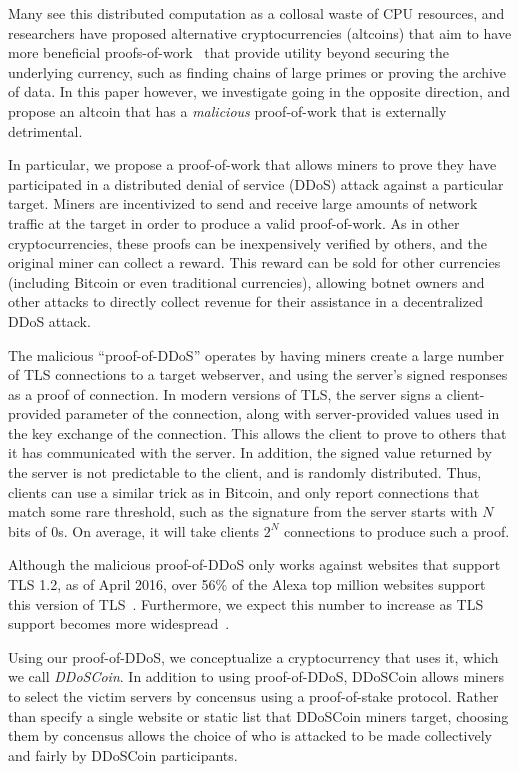 Many see this distributed computation as a collosal waste of CPU resources, and researchers have proposed
alternative cryptocurrencies (altcoins) that aim to have more beneficial
proofs-of-work~\cite{primecoin,permacoin} that provide utility beyond securing
the underlying currency, such as finding chains of large primes or
proving the archive of data. In this paper however, we investigate going in the
opposite direction, and propose an altcoin that has a \emph{malicious}
proof-of-work that is externally detrimental.

In particular, we propose a proof-of-work that allows miners to prove they have
participated in a distributed denial of service (DDoS) attack against a
particular target. Miners are incentivized to send and receive large amounts of network
traffic at the target in order to produce a valid proof-of-work. As in other
cryptocurrencies, these proofs can be inexpensively verified by others, and the
original miner can collect a reward. This reward can be sold for other
currencies (including Bitcoin or even traditional currencies), allowing botnet
owners and other attacks to directly collect revenue for their assistance
in a decentralized DDoS attack.


The malicious ``proof-of-DDoS'' operates by having miners create a large number of
TLS connections to a target webserver, and using the server's signed responses
as a proof of connection. In modern versions of TLS, the server signs a
client-provided parameter of the connection, along with server-provided values
used in the key exchange of the connection. This allows the client to prove to
others that it has communicated with the server. In addition, the signed value
returned by the server is not predictable to the client, and is randomly
distributed. Thus, clients can use a similar trick as in Bitcoin, and only
report connections that match some rare threshold, such as the signature from
the server starts with $N$ bits of 0s. On average, it will take clients $2^{N}$
connections to produce such a proof.

Although the malicious proof-of-DDoS only works against websites that support
TLS 1.2, as of April 2016, over 56\% of the Alexa top million websites support
this version of TLS~\cite{censys}. Furthermore, we
expect this number to increase as TLS support becomes more
widespread~\cite{letsencrypt}.

Using our proof-of-DDoS, we conceptualize a cryptocurrency that uses it, which
we call \emph{DDoSCoin}. In addition to using proof-of-DDoS, DDoSCoin allows
miners to select the victim servers by concensus using a proof-of-stake
protocol. Rather than specify a single website or static list that DDoSCoin
miners target, choosing them by concensus allows the choice of who is attacked
to be made collectively and fairly by DDoSCoin participants.

